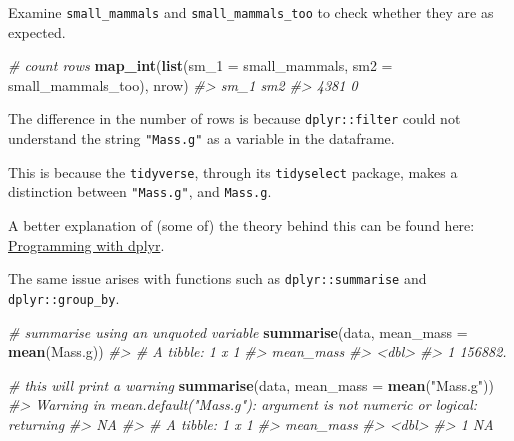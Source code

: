 \documentclass[]{book}
\newenvironment{Shaded}{}{}
\newcommand{\CommentTok}[1]{\textcolor[rgb]{0.38,0.63,0.69}{\textit{#1}}}
\newcommand{\DataTypeTok}[1]{\textcolor[rgb]{0.56,0.13,0.00}{#1}}
\newcommand{\DecValTok}[1]{\textcolor[rgb]{0.25,0.63,0.44}{#1}}
\newcommand{\KeywordTok}[1]{\textcolor[rgb]{0.00,0.44,0.13}{\textbf{#1}}}
\newcommand{\NormalTok}[1]{#1}
\newcommand{\OperatorTok}[1]{\textcolor[rgb]{0.40,0.40,0.40}{#1}}
\newcommand{\StringTok}[1]{\textcolor[rgb]{0.25,0.44,0.63}{#1}}
\begin{document}
\begin{Shaded}
\end{Shaded}

Examine \texttt{small\_mammals} and \texttt{small\_mammals\_too} to check whether they are as expected.

\begin{Shaded}
\begin{Highlighting}[]
\CommentTok{# count rows}
\KeywordTok{map_int}\NormalTok{(}\KeywordTok{list}\NormalTok{(}\DataTypeTok{sm_1 =}\NormalTok{ small_mammals, }\DataTypeTok{sm2 =}\NormalTok{ small_mammals_too),}
\NormalTok{        nrow)}
\CommentTok{#> sm_1  sm2 }
\CommentTok{#> 4381    0}
\end{Highlighting}
\end{Shaded}

The difference in the number of rows is because \texttt{dplyr::filter} could not understand the string \texttt{"Mass.g"} as a variable in the dataframe.

This is because the \texttt{tidyverse}, through its \texttt{tidyselect} package, makes a distinction between \texttt{"Mass.g"}, and \texttt{Mass.g}.

A better explanation of (some of) the theory behind this can be found here: \href{https://dplyr.tidyverse.org/articles/programming.html\#setting-variable-names}{Programming with dplyr}.

The same issue arises with functions such as \texttt{dplyr::summarise} and \texttt{dplyr::group\_by}.

\begin{Shaded}
\begin{Highlighting}[]
\CommentTok{# summarise using an unquoted variable}
\KeywordTok{summarise}\NormalTok{(data,}
          \DataTypeTok{mean_mass =} \KeywordTok{mean}\NormalTok{(Mass.g))}
\CommentTok{#> # A tibble: 1 x 1}
\CommentTok{#>   mean_mass}
\CommentTok{#>       <dbl>}
\CommentTok{#> 1   156882.}

\CommentTok{# this will print a warning}
\KeywordTok{summarise}\NormalTok{(data,}
          \DataTypeTok{mean_mass =} \KeywordTok{mean}\NormalTok{(}\StringTok{"Mass.g"}\NormalTok{))}
\CommentTok{#> Warning in mean.default("Mass.g"): argument is not numeric or logical: returning}
\CommentTok{#> NA}
\CommentTok{#> # A tibble: 1 x 1}
\CommentTok{#>   mean_mass}
\CommentTok{#>       <dbl>}
\CommentTok{#> 1        NA}
\end{Highlighting}
\end{Shaded}
\end{document}
